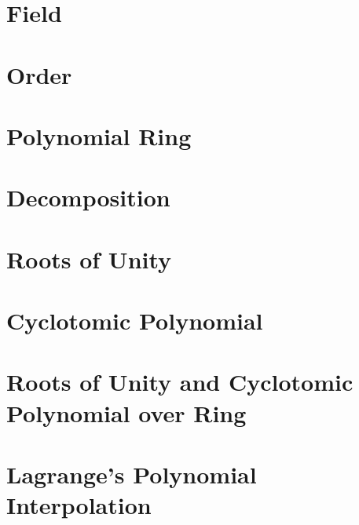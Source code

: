 \documentclass[11pt]{article}
\begin{document}
\section{Field}
\label{sec:field}


\clearpage

\section{Order}
\label{sec:order}




\clearpage

\section{Polynomial Ring}
\label{sec:polynomial-ring}


\clearpage

\section{Decomposition}
\label{sec:decomp}



\clearpage

\section{Roots of Unity}
\label{sec:roots}


\clearpage

\section{Cyclotomic Polynomial}
\label{sec:cyclotomic}


\clearpage

\section{Roots of Unity and Cyclotomic Polynomial over Ring}
\label{sec:cyclotomic-polynomial-integer-ring}


\clearpage

\section{Lagrange's Polynomial Interpolation}
\label{sec:polynomial-interpolation}

\end{document}
